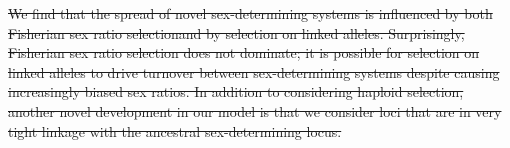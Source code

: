 \documentclass[10pt,letterpaper]{article}
\providecommand{\DIFdeltex}[1]{{\protect\color{red}\sout{#1}}}                      %
\providecommand{\DIFaddbegin}{} %
\providecommand{\DIFdelbegin}{} %
\providecommand{\DIFdelend}{} %
\providecommand{\DIFdel}[1]{\texorpdfstring{\DIFdeltex{#1}}{}} %
\newcommand{\DIFscaledelfig}{0.5}
\newlength{\DIFdelgraphicswidth} %
\newlength{\DIFdelgraphicsheight} %
\newcommand{\DIFaddincludegraphics}[2][]{{\color{blue}\fbox{\DIFOincludegraphics[#1]{#2}}}} %
\newcommand{\DIFdelincludegraphics}[2][]{%
\sbox{\DIFdelgraphicsbox}{\DIFOincludegraphics[#1]{#2}}%
\settoboxwidth{\DIFdelgraphicswidth}{\DIFdelgraphicsbox} %
\settoboxtotalheight{\DIFdelgraphicsheight}{\DIFdelgraphicsbox} %
\scalebox{\DIFscaledelfig}{%
\parbox[b]{\DIFdelgraphicswidth}{\usebox{\DIFdelgraphicsbox}\\[-\baselineskip] \rule{\DIFdelgraphicswidth}{0em}}\llap{\resizebox{\DIFdelgraphicswidth}{\DIFdelgraphicsheight}{%
\setlength{\unitlength}{\DIFdelgraphicswidth}%
\begin{picture}(1,1)%
\thicklines\linethickness{2pt} %
{\color[rgb]{1,0,0}\put(0,0){\framebox(1,1){}}}%
{\color[rgb]{1,0,0}\put(0,0){\line( 1,1){1}}}%
{\color[rgb]{1,0,0}\put(0,1){\line(1,-1){1}}}%
\end{picture}%
}\hspace*{3pt}}} %
} %
\DeclareRobustCommand{\DIFaddbegin}{\DIFOaddbegin \let\includegraphics\DIFaddincludegraphics} %
\DeclareRobustCommand{\DIFdelbegin}{\DIFOdelbegin \let\includegraphics\DIFdelincludegraphics} %
\DeclareRobustCommand{\DIFdelend}{\DIFOaddend \let\includegraphics\DIFOincludegraphics} %
\begin{document}
\DIFdelbegin \DIFdel{We find that the spread of novel sex-determining systems is influenced by both Fisherian sex ratio selectionand by selection on linked alleles. 
Surprisingly, Fisherian sex ratio selection does not dominate; it is possible for selection on linked alleles to drive turnover between sex-determining systems despite causing increasingly biased sex ratios. 
In addition to considering haploid selection, another novel development in our model is that we consider loci that are in very tight linkage with the ancestral sex-determining locus. 
}\DIFdelend %
\DIFaddbegin 


\end{document}
